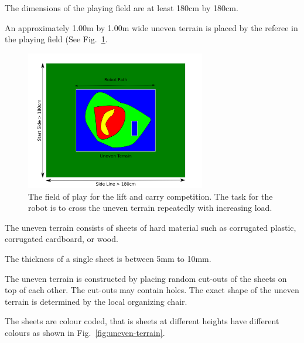 \documentclass[12pt]{hurocup}
\begin{document}
\begin{lawlist}[LC]

\item The dimensions of the playing field are at least 180cm by
  180cm.

\item An approximately 1.00m by 1.00m wide uneven terrain is placed by
the referee in the playing field (See
Fig.~\ref{fig:lift-and-carry-field}.

  \begin{figure}
    \begin{center}
      \includegraphics[width=0.7\textwidth]{Figures/lift-and-carry}
    \end{center}
    \caption{The field of play for the lift and carry competition. The
      task for the robot is to cross the uneven terrain repeatedly with
      increasing load.}
    \label{fig:lift-and-carry-field}
  \end{figure}

\item The uneven terrain consists of sheets of hard material such as
corrugated plastic, corrugated cardboard, or wood. 

\item The thickness of a single sheet is between 5mm to 10mm.

\item The uneven terrain is constructed by placing random cut-outs of
the sheets on top of each other. The cut-outs may contain holes.  The
exact shape of the uneven terrain is determined by the local
organizing chair.

\item The sheets are colour coded, that is sheets at different heights
have different colours as shown in Fig.~\ref{fig:uneven-terrain}.


\end{lawlist}
\end{document}
